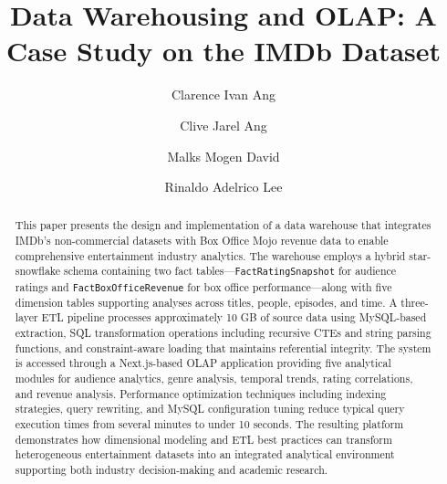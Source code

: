\documentclass[sigconf, pbalance]{acmart}
\begin{document}
\title{Data Warehousing and OLAP: A Case Study on the IMDb Dataset}

\author{Clarence Ivan Ang}

\author{Clive Jarel Ang}

\author{Malks Mogen David}

\author{Rinaldo Adelrico Lee}

%
\renewcommand{\shortauthors}{Ang et al.}


\begin{abstract}
This paper presents the design and implementation of a data warehouse that integrates IMDb's non-commercial datasets with Box Office Mojo revenue data to enable comprehensive entertainment industry analytics. The warehouse employs a hybrid star-snowflake schema containing two fact tables—\texttt{FactRatingSnapshot} for audience ratings and \texttt{FactBoxOfficeRevenue} for box office performance—along with five dimension tables supporting analyses across titles, people, episodes, and time. A three-layer ETL pipeline processes approximately 10 GB of source data using MySQL-based extraction, SQL transformation operations including recursive CTEs and string parsing functions, and constraint-aware loading that maintains referential integrity. The system is accessed through a Next.js-based OLAP application providing five analytical modules for audience analytics, genre analysis, temporal trends, rating correlations, and revenue analysis. Performance optimization techniques including indexing strategies, query rewriting, and MySQL configuration tuning reduce typical query execution times from several minutes to under 10 seconds. The resulting platform demonstrates how dimensional modeling and ETL best practices can transform heterogeneous entertainment datasets into an integrated analytical environment supporting both industry decision-making and academic research.
\end{abstract}
\end{document}
